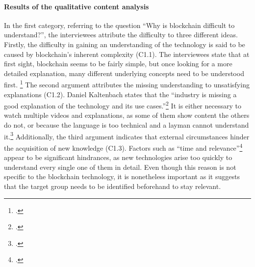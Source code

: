 \paragraph{Results of the qualitative content analysis} In the first category, referring to the question \enquote{Why is blockchain difficult to understand?}, the interviewees attribute the difficulty to three different ideas. Firstly, the difficulty in gaining an understanding of the technology is said to be caused by blockchain's inherent complexity (C1.1). The interviewees state that at first sight, blockchain seems to be fairly simple, but once looking for a more detailed explanation, many different underlying concepts need to be understood first. \footcites[Cf.][P73, P74, P75]{DanielKaltenbach_Interview}[cf.][P113]{RalphBeckmann_Interview} The second argument attributes the missing understanding to unsatisfying explanations (C1.2). Daniel Kaltenbach states that the \enquote{industry is missing a good explanation of the technology and its use cases.}\footcite[][P5]{DanielKaltenbach_Interview} It is either necessary to watch multiple videos and explanations, as some of them show content the others do not, or because the language is too technical and a layman cannot understand it.\footcites[Cf.][P7, P8, P19, P20 ]{DanielKaltenbach_Interview}[cf.][P131]{RalphBeckmann_Interview} Additionally, the third argument indicates that external circumstances hinder the acquisition of new knowledge (C1.3). Factors such as \enquote{time and relevance}\footcite[][P9]{DanielKaltenbach_Interview} appear to be significant hindrances, as new technologies arise too quickly to understand every single one of them in detail. Even though this reason is not specific to the blockchain technology, it is nonetheless important as it suggests that the target group needs to be identified beforehand to stay relevant.

